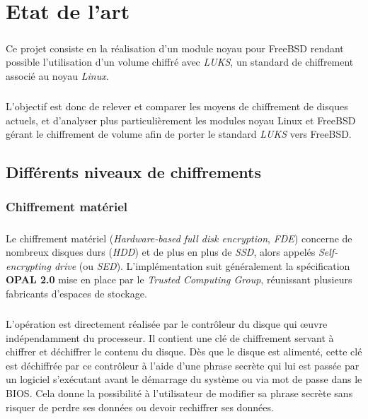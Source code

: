 \chapter{Etat de l'art}

\paragraph{}
Ce projet consiste en la réalisation d'un module noyau pour FreeBSD rendant
possible l'utilisation d'un volume chiffré avec
\textit{LUKS}\cite{onDiskFormatLuks}, un standard de chiffrement associé au
noyau \textit{Linux}.
\paragraph{}
L'objectif est donc de relever et comparer les moyens de chiffrement de disques
actuels, et d'analyser plus particulièrement les modules noyau Linux et FreeBSD
gérant le chiffrement de volume afin de porter le standard
\textit{LUKS}\cite{onDiskFormatLuks} vers FreeBSD.

\section{Différents niveaux de chiffrements}

\subsection{Chiffrement matériel}
\paragraph{}
Le chiffrement matériel (\textit{Hardware-based full disk encryption},
\textit{FDE}) concerne de nombreux disques durs (\textit{HDD}) et de plus en
plus de \textit{SSD}, alors appelés \textit{Self-encrypting drive} (ou
\textit{SED}). L'implémentation suit généralement la spécification \textbf{OPAL
  2.0} mise en place par le \textit{Trusted Computing Group}, réunissant
plusieurs fabricants d'espaces de stockage.
\paragraph{}
L'opération est directement réalisée par le contrôleur du disque qui œuvre
indépendamment du processeur. Il contient une clé de chiffrement servant à
chiffrer et déchiffrer le contenu du disque. Dès que le disque est alimenté,
cette clé est déchiffrée par ce contrôleur à l'aide d'une phrase secrète qui lui
est passée par un logiciel s'exécutant avant le démarrage du système ou via mot
de passe dans le BIOS. Cela donne la possibilité à l'utilisateur de modifier sa
phrase secrète sans risquer de perdre ses données ou devoir rechiffrer ses
données.

